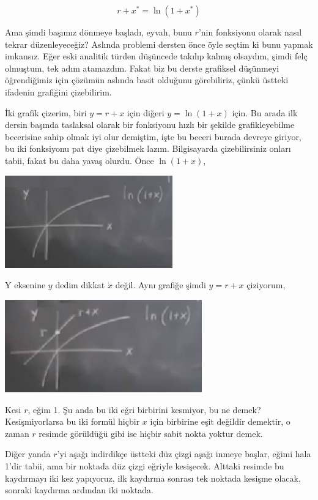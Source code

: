 \documentclass[12pt,fleqn]{article}\usepackage{../../common}
\begin{document}
$$ r + x^* = \ln(1+x^*) $$

Ama şimdi başımız dönmeye başladı, eyvah, bunu $r$'nin fonksiyonu olarak nasıl
tekrar düzenleyeceğiz? Aslında problemi dersten önce öyle seçtim ki bunu yapmak
imkansız. Eğer eski analitik türden düşüncede takılıp kalmış olsaydım, şimdi
felç olmuştum, tek adım atamazdım. Fakat biz bu derste grafiksel düşünmeyi
öğrendiğimiz için çözümün aslında basit olduğunu görebiliriz, çünkü üstteki
ifadenin grafiğini çizebilirim.

İki grafik çizerim, biri $y = r + x$ için diğeri $y = \ln(1 + x)$ için. Bu arada
ilk dersin başında taslaksal olarak bir fonksiyonu hızlı bir şekilde
grafikleyebilme becerisine sahip olmak iyi olur demiştim, işte bu beceri burada
devreye giriyor, bu iki fonksiyonu pat diye çizebilmek lazım. Bilgisayarda
çizebilirsiniz onları tabii, fakat bu daha yavaş olurdu. Önce $\ln(1+x)$,

\includegraphics[height=4cm]{02_15.png}

Y eksenine $y$ dedim dikkat $\dot{x}$ değil. Aynı grafiğe şimdi $y = r + x$
çiziyorum,

\includegraphics[height=4cm]{02_16.png}

Kesi $r$, eğim 1. Şu anda bu iki eğri birbirini kesmiyor, bu ne demek?
Kesişmiyorlarsa bu iki formül hiçbir $x$ için birbirine eşit değildir demektir,
o zaman $r$ resimde görüldüğü gibi ise hiçbir sabit nokta yoktur demek.

Diğer yanda $r$'yi aşağı indirdikçe üstteki düz çizgi aşağı inmeye başlar, eğimi
hala 1'dir tabii, ama bir noktada düz çizgi eğriyle kesişecek. Alttaki resimde
bu kaydırmayı iki kez yapıyoruz, ilk kaydırma sonrası tek noktada kesişme
olacak, sonraki kaydırma ardından iki noktada.
\end{document}
